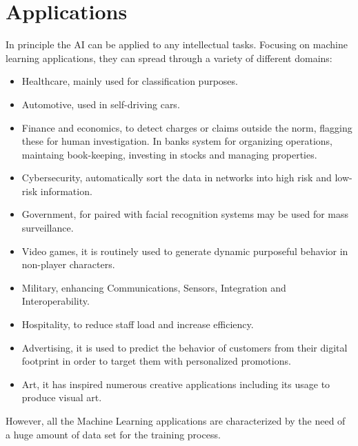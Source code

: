 \section{Applications}
In principle the AI can be applied to any intellectual tasks\cite{book:1}. Focusing on machine learning applications, they can spread through a variety of different domains:
\begin{itemize}
\item Healthcare, mainly used for classification purposes.
\item Automotive, used in self-driving cars.
\item Finance and economics, to detect charges or claims outside the norm, flagging these for human investigation. In banks system for organizing operations, maintaing book-keeping, investing in stocks and managing properties.
\item Cybersecurity, automatically sort the data in networks into high risk and low-risk information.
\item Government, for paired with facial recognition systems may be used for mass surveillance.
\item Video games, it is routinely used to generate dynamic purposeful behavior in non-player characters.
\item Military, enhancing Communications, Sensors, Integration and Interoperability.
\item Hospitality, to reduce staff load and increase efficiency.
\item Advertising, it is used to predict the behavior of customers from their digital footprint in order to target them with personalized promotions.
\item Art, it has inspired numerous creative applications including its usage to produce visual art.
\end{itemize}
However, all the Machine Learning applications are characterized by the need of a huge amount of data set for the training process.
